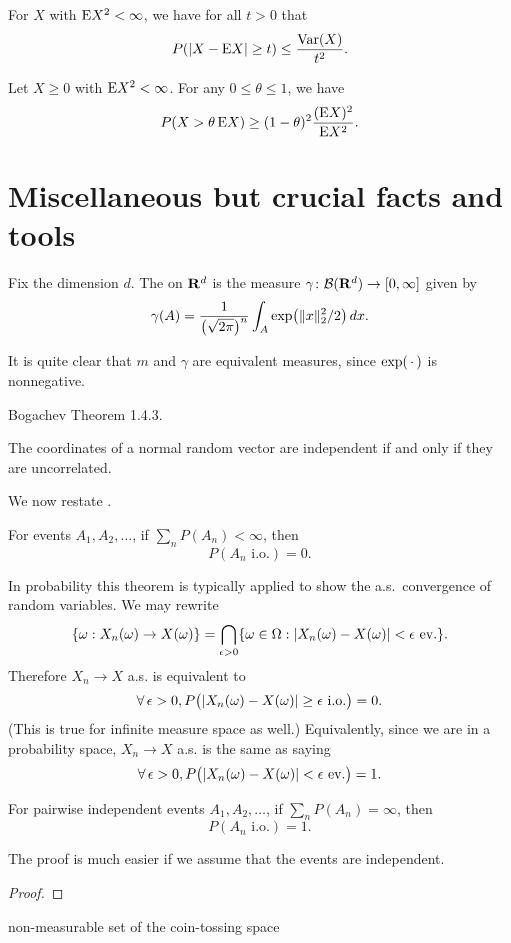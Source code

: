 \begin{namedthm}
    For $X$ with $\mathop{}\!\mathrm{E} X^2 < \infty$, we have for all $t > 0$ that \[
        P(\lvert X - \mathop{}\!\mathrm{E} X \rvert \geq t) \leq \frac{\operatorname{Var}(X)}{t^2}.
    \]
\end{namedthm}

\begin{namedthm} \label{thm:PZ-ineq}
    Let $X \geq 0$ with $\mathop{}\!\mathrm{E} X^2 < \infty$. For any $0\leq \theta\leq 1$, we have \[
        P(X > \theta \mathop{}\!\mathrm{E} X) \geq (1-\theta)^2 \frac{(\mathop{}\!\mathrm{E} X)^2}{\mathop{}\!\mathrm{E} X^2}.
    \]
\end{namedthm}

\section{Miscellaneous but crucial facts and tools}
\begin{defn}
    Fix the dimension $d$. The  on $\mathbf{R}^d$ is the measure $\gamma\colon \mathcal{B}(\mathbf{R}^d) \to [0,\infty]$ given by \[
        \gamma(A) = \frac{1}{\bigl(\sqrt{2\pi}\bigr)^n} \int_A \exp\bigl(\lVert x \rVert^2_2/2\bigr)\,dx.
    \]
\end{defn}

It is quite clear that $m$ and $\gamma$ are equivalent measures, since $\exp(\,\cdot\,)$ is nonnegative.

Bogachev Theorem 1.4.3.

The coordinates of a normal random vector are independent if and only if they are uncorrelated.

We now restate .

\begin{namedthm} \label{thm:BorelCantelli-1-prob}
    For events $A_1,A_2,\dotsc$, if $\sum_n P(A_n) < \infty$, then \[
        P(A_n \text{ i.o.}) = 0.
    \]
\end{namedthm}

In probability this theorem is typically applied to show the a.s.\ convergence of random variables. We may rewrite \[
    \{\omega: X_n(\omega) \to X(\omega)\} = \bigcap_{\epsilon >0}\{\omega \in \Omega: \lvert X_n(\omega) - X(\omega) \rvert < \epsilon\text{ ev.}\}.
\] Therefore $X_n \to X$ a.s. is equivalent to \[
    \forall\,\epsilon >0, P\bigl(\lvert X_n(\omega) - X(\omega) \rvert \geq \epsilon\text{ i.o.}\bigr) = 0.
\] (This is true for infinite measure space as well.) Equivalently, since we are in a probability space, $X_n \to X$ a.s. is the same as saying \[
    \forall\,\epsilon >0, P\bigl(\lvert X_n(\omega) - X(\omega) \rvert < \epsilon\text{ ev.}\bigr) = 1.
\]

\begin{namedthm}
    For pairwise independent events $A_1,A_2,\dotsc$, if $\sum_n P(A_n) = \infty$, then \[
        P(A_n \text{ i.o.}) = 1.
    \]
\end{namedthm}

The proof is much easier if we assume that the events are independent.

\begin{proof}
    
\end{proof}

non-measurable set of the coin-tossing space